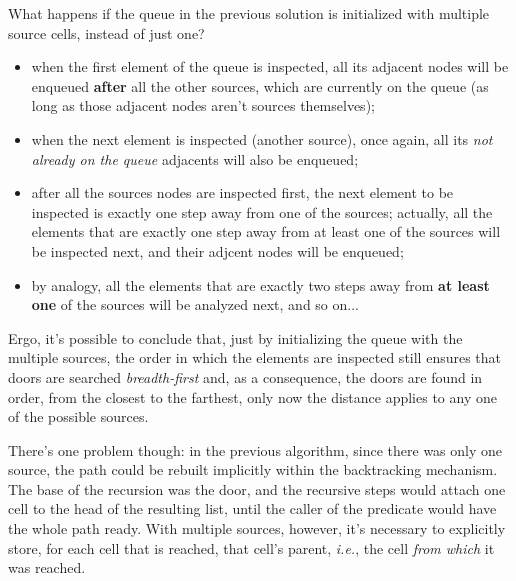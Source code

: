 \documentclass[12pt,a4paper]{article}
\begin{document}
What happens if the queue in the previous solution is initialized with multiple source cells, instead of just one?
\begin{itemize}
    \item when the first element of the queue is inspected, all its adjacent nodes will be enqueued \textbf{after} all the other sources, which are currently on the queue (as long as those adjacent nodes aren't sources themselves);
    
    \item when the next element is inspected (another source), once again, all its \textit{not already on the queue} adjacents will also be enqueued;
    
    \item after all the sources nodes are inspected first, the next element to be inspected is exactly one step away from one of the sources; actually, all the elements that are exactly one step away from at least one of the sources will be inspected next, and their adjcent nodes will be enqueued;
    
    \item by analogy, all the elements that are exactly two steps away from \textbf{at least one} of the sources will be analyzed next, and so on...
\end{itemize}

Ergo, it's possible to conclude that, just by initializing the queue with the multiple sources, the order in which the elements are inspected still ensures that doors are searched \textit{breadth-first} and, as a consequence, the doors are found in order, from the closest to the farthest, only now the distance applies to any one of the possible sources.

There's one problem though: in the previous algorithm, since there was only one source, the path could be rebuilt implicitly within the backtracking mechanism. The base of the recursion was the door, and the recursive steps would attach one cell to the head of the resulting list, until the caller of the predicate would have the whole path ready. With multiple sources, however, it's necessary to explicitly store, for each cell that is reached, that cell's parent, \textit{i.e.}, the cell \textit{from which} it was reached.
\end{document}
